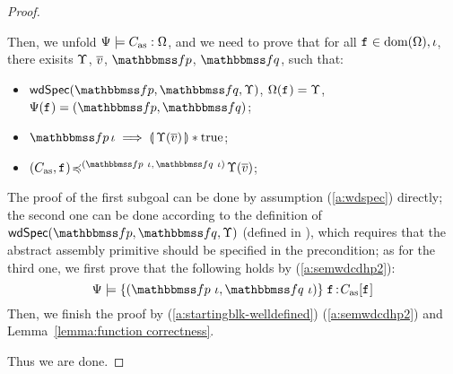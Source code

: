 {\begin{proof}
\begin{itemize}
            Then, we unfold ${\Psi} \models {C_{\text{as}}} : {\Omega}$,
            and we need to prove that for all $\texttt{f}_{} \in \text{dom}(\Omega),
            \iota$, there exisits $\Upsilon$, $\overline{v}$,
            $\relspecpre$, $\relspecpost$, such that:
            \begin{itemize}
                \small
                \item $\wdSpec{\relspecpre}{\relspecpost}{\hprim}$,
                    $\Omega(\texttt{f}_{}) = \Upsilon$,
                    $\Cspec(\lab{}) = (\relspecpre, \relspecpost)$;
                \item $\relspecpre \, \lgvl \implies
                    \safePrimAst{\, \hprim(\args{\val}) \,}
                    \sepstar \atrue$;
                \item $\simFunction{(\asmimp, \lab{})}
                    {(\relspecpre \ \lgvl, \,\relspecpost \ \lgvl)}
                    {\hprim(\args{\val})}$;
            \end{itemize}
            The proof of the first subgoal can be done by
            assumption (\ref{a:wdspec}) directly; the second
            one can be done according to the definition of
            $\wdSpec{\relspecpre}{\relspecpost}{\hprim}$
            (defined in \Def{\ref{def:well-defined specification}}),
            which requires that the abstract assembly primitive should
            be specified in the precondition; as for the
            third one, we first prove that the following
            holds by (\ref{a:semwdcdhp2}):
            \begin{equation}
                \semwfseqrel{\Cspec}{\relspecpre \ \lgvl}
                    {\relspecpost \ \lgvl}{\asmimp[\lab{}]}
                \label{a:startingblk-welldefined}
            \end{equation}
            Then, we finish the proof by
            (\ref{a:startingblk-welldefined})
            (\ref{a:semwdcdhp2}) and
            Lemma~\ref{lemma:function correctness}.
    \end{itemize}
    Thus we are done.
\end{proof}

}
